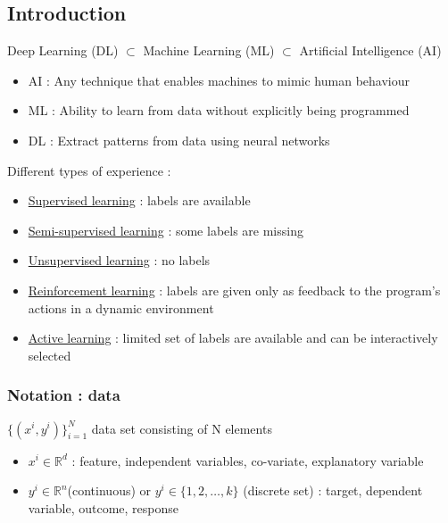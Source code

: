 \documentclass[../main.tex]{subfiles}
\begin{document}
\localtableofcontents
\subsection{Introduction}
Deep Learning (DL) $\subset$ Machine Learning (ML) $\subset$ Artificial Intelligence (AI)\\

\begin{itemize}
    \item AI : Any technique that enables machines to mimic human behaviour\\
    \item ML : Ability to learn from data without explicitly being programmed\\
    \item DL : Extract patterns from data using neural networks\\
\end{itemize}

Different types of experience : \begin{itemize}
    \item \underline{Supervised learning} : labels are available\\
    \item \underline{Semi-supervised learning} : some labels are missing\\
    \item \underline{Unsupervised learning} : no labels\\
    \item \underline{Reinforcement learning} : labels are given only as feedback to the program's actions in a dynamic environment\\
    \item \underline{Active learning} : limited set of labels are available and can be interactively selected\\
\end{itemize}

\subsubsection{Notation : data}
$\{ (x^i, y^i)\}_{i=1}^N$ data set consisting of N elements\\
\begin{itemize}
    \item $x^i \in \mathbb{R}^d$ : feature, independent variables, co-variate, explanatory variable\\
    \item $y^i \in \mathbb{R}^n$(continuous) or $y^i \in \{1,2,\dots, k\}$ (discrete set) : target, dependent variable, outcome, response\\
\end{itemize}
\end{document}
